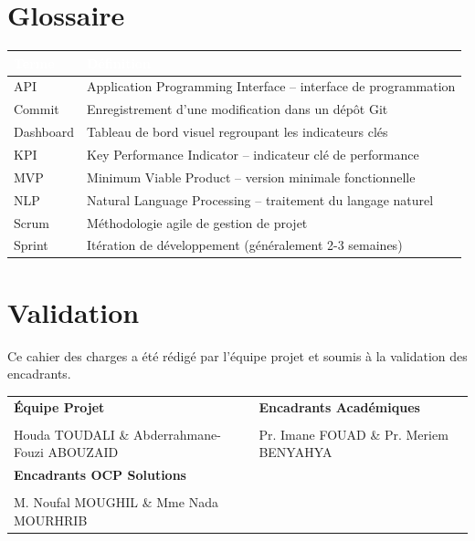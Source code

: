 \documentclass[12pt,a4paper]{article}
\begin{document}
\section{Glossaire}

\begin{center}
\begin{tabularx}{\textwidth}{|L{2.5cm}|X|}
\hline
{}
\textcolor{white}{\textbf{Terme}} & \textcolor{white}{\textbf{D\'efinition}} \\
\hline
API & Application Programming Interface -- interface de programmation \\
\hline
{}
Commit & Enregistrement d'une modification dans un d\'ep\^ot Git \\
\hline
Dashboard & Tableau de bord visuel regroupant les indicateurs cl\'es \\
\hline
{}
KPI & Key Performance Indicator -- indicateur cl\'e de performance \\
\hline
MVP & Minimum Viable Product -- version minimale fonctionnelle \\
\hline
{}
NLP & Natural Language Processing -- traitement du langage naturel \\
\hline
Scrum & M\'ethodologie agile de gestion de projet \\
\hline
{}
Sprint & It\'eration de d\'eveloppement (g\'en\'eralement 2-3 semaines) \\
\hline
\end{tabularx}
\end{center}

\newpage
\section{Validation}

Ce cahier des charges a \'et\'e r\'edig\'e par l'\'equipe projet et soumis \`a la validation des encadrants.

\vspace{2cm}

\begin{tabularx}{\textwidth}{XX}
\textbf{\textcolor{primary}{\'Equipe Projet}} & \textbf{\textcolor{primary}{Encadrants Acad\'emiques}} \\[2.5cm]
\dotfill & \dotfill \\
Houda TOUDALI \& Abderrahmane-Fouzi ABOUZAID & Pr. Imane FOUAD \& Pr. Meriem BENYAHYA \\[2.5cm]
\textbf{\textcolor{primary}{Encadrants OCP Solutions}} & \\[2.5cm]
\dotfill & \\
M. Noufal MOUGHIL \& Mme Nada MOURHRIB & \\
\end{tabularx}
\end{document}
